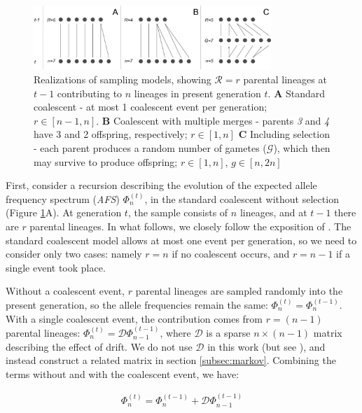 \documentclass[review]{elsarticle}
\begin{document}
\begin{figure}[ht]
  \centering
  \includegraphics[width=0.8\textwidth]{fig/schematic.pdf}
  \caption{\label{fig:schematic} Realizations of sampling models, showing $\mathcal{R}=r$ parental
    lineages at $t-1$ contributing to $n$ lineages in present generation $t$. \textbf{A} Standard
    coalescent - at most 1 coalescent event per generation; $r\in[n-1, n]$. \textbf{B} Coalescent
    with multiple merges - parents \textit{3} and \textit{4} have 3 and 2 offspring, respectively;
    $r \in [1, n]$ \textbf{C} Including selection - each parent produces a random number of gametes
    ($\mathcal{G}$), which then may survive to produce offspring; $r \in [1, n]$, $g \in [n, 2n]$ }
\end{figure}

First, consider a recursion describing the evolution of the expected allele frequency spectrum
(\textit{AFS}) $\Phi_{n}^{(t)}$, in the standard coalescent without selection (Figure
\ref{fig:schematic}A). At generation $t$, the sample consists of $n$ lineages, and at $t-1$ there
are $r$ parental lineages. In what follows, we closely follow the exposition of
\cite{JouganousEtAl2017}. The standard coalescent model allows at most one event per generation, so
we need to consider only two cases: namely $r=n$ if no coalescent occurs, and $r=n-1$ if a single
event took place.

Without a coalescent event, $r$ parental lineages are sampled randomly into the present generation,
so the allele frequencies remain the same: $\Phi_{n}^{(t)}=\Phi_{n}^{(t-1)}$. With a single
coalescent event, the contribution comes from $r=(n-1)$ parental lineages:
$\Phi_{n}^{(t)}=\mathcal{D}\Phi_{n-1}^{(t-1)}$, where $\mathcal{D}$ is a sparse $n \times (n-1)$
matrix describing the effect of drift. We do not use $\mathcal{D}$ in this work (but see
\citep{JouganousEtAl2017}), and instead construct a related matrix in section \ref{subsec:markov}.
Combining the terms without and with the coalescent event, we have:

\begin{align}
  \label{eq:op-neutral}
  \Phi_{n}^{(t)}=\Phi_{n}^{(t-1)}+\mathcal{D} \Phi_{n-1}^{(t-1)}
\end{align}
\end{document}
